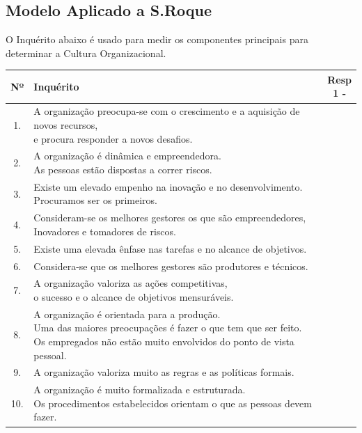 \subsection{Modelo Aplicado a S.Roque}
O Inquérito abaixo é usado para medir os componentes principais para determinar a Cultura Organizacional.
\begin{table}[h!]
\begin{adjustbox}{max width=\textwidth}
\begin{tabular}{ |c|l|c| }
\hline
\rowcolor[gray]{0.5}
Nº & Inquérito & \makecell[l]{Resp \\ 1 \; - \; 7} \\
\hline
1. & \makecell[l]{A organização preocupa-se com o crescimento e a aquisição de novos recursos, \\ e procura responder a novos desafios.} & \\
\hline
2. & \makecell[l]{A organização é dinâmica e empreendedora. \\ As pessoas estão dispostas a correr riscos.} & \\
\hline
3. & \makecell[l]{Existe um elevado empenho na inovação e no desenvolvimento. \\ Procuramos ser os primeiros.} & \\
\hline
4. & \makecell[l]{Consideram-se os melhores gestores os que são empreendedores, \\ Inovadores e tomadores de riscos.} & \\
\hline
5. & Existe uma elevada ênfase nas tarefas e no alcance de objetivos. & \\
\hline
6. & Considera-se que os melhores gestores são produtores e técnicos. & \\
\hline
7. & \makecell[l]{A organização valoriza as ações competitivas, \\ o sucesso e o alcance de objetivos mensuráveis.} & \\
\hline
8. & \makecell[l]{A organização é orientada para a produção. \\ Uma das maiores preocupações é fazer o que tem que ser feito. \\ Os empregados não estão muito envolvidos do ponto de vista pessoal.} & \\
\hline
9. & A organização valoriza muito as regras e as políticas formais. & \\
\hline
10. & \makecell[l]{A organização é muito formalizada e estruturada. \\ Os procedimentos estabelecidos orientam o que as pessoas devem fazer.} & \\

\end{tabular}
\end{adjustbox}
\end{table}
